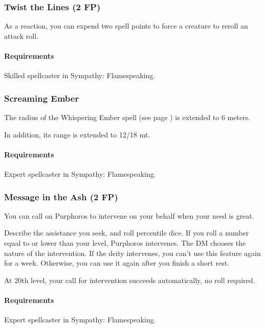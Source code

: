 \subsubsection{Twist the Lines (2 FP)} \label{feat::twistthelines}
    As a reaction, you can expend two spell points to force a creature to reroll an attack roll.
    \paragraph{Requirements} Skilled spellcaster in Sympathy: Flamespeaking.
\subsubsection{Screaming Ember} \label{feat::screamingember}
    The radius of the Whispering Ember spell (see page \pageref{spell::whisperingember}) is extended to 6 meters.

    In addition, its range is extended to 12/18 mt.
    \paragraph{Requirements} Expert spellcaster in Sympathy: Flamespeaking.
\subsubsection{Message in the Ash (2 FP)} \label{feat::messageintheash}
    You can call on Purphoros to intervene on your behalf when your need is great.

    Describe the assistance you seek, and roll percentile dice.
    If you roll a number equal to or lower than your level, Purphoros intervenes.
    The DM chooses the nature of the intervention.
    If the deity intervenes, you can't use this feature again for a week.
    Otherwise, you can use it again after you finish a short rest.

    At 20th level, your call for intervention succeeds automatically, no roll required.
    \paragraph{Requirements} Expert spellcaster in Sympathy: Flamespeaking.

